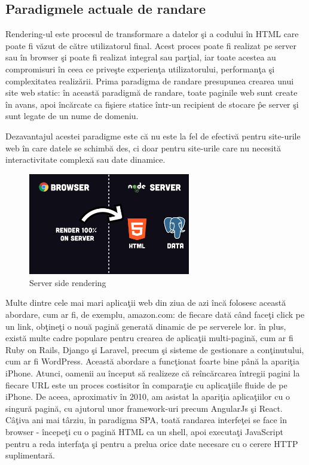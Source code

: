 \documentclass[12pt, a4paper]{report}
\begin{document}
\subsection{Paradigmele actuale de randare}

Rendering-ul este procesul de transformare a datelor \c si a codului \^ in HTML care poate fi v\u azut de c\u atre utilizatorul final. Acest proces poate fi realizat pe server sau \^ in browser \c si poate fi realizat integral sau par\c tial, iar toate acestea au compromisuri \^ in ceea ce prive\c ste experien\c ta utilizatorului, performan\c ta \c si complexitatea realizării. Prima paradigma de randare presupunea crearea unui site web static: \^ in aceast\u a paradigm\u a de randare, toate paginile web sunt create \^ in avans, apoi \^ inc\u arcate ca fi\c siere statice \^ intr-un recipient de stocare \^ pe server \c si sunt legate de un nume de domeniu.

Dezavantajul acestei paradigme este c\u a nu este la fel de efectivă pentru site-urile web \^ in care datele se schimb\u a des, ci doar pentru site-urile care nu necesit\u a interactivitate complexă sau date dinamice. \cite{benefitsserverrendering}

\begin{figure}[htbp]
	\centering
	\includegraphics[width=0.63\textwidth]{37.png}
	\caption{Server side rendering}
	\label{fig:server rendering}
\end{figure}

Multe dintre cele mai mari aplica\c tii web din ziua de azi \^ inc\u a folosesc aceast\u a abordare, cum ar fi, de exemplu, amazon.com: de fiecare dat\u a c\^ and face\c ti click pe un link, ob\c tine\c ti o nou\u a pagin\u a generat\u a dinamic de pe serverele lor. \^ in plus, exist\u a multe cadre populare pentru crearea de aplica\c tii multi-pagin\u a, cum ar fi Ruby on Rails, Django \c si Laravel, precum \c si sisteme de gestionare a con\c tinutului, cum ar fi WordPress. Aceast\u a abordare a func\c tionat foarte bine p\^ an\u a la apari\c tia iPhone. Atunci, oamenii au \^ inceput s\u a realizeze c\u a re\^ inc\u arcarea \^ intregii pagini la fiecare URL este un proces costisitor \^ in compara\c tie cu aplica\c tiile fluide de pe iPhone. De aceea, aproximativ \^ in 2010, am asistat la apari\c tia aplica\c tiilor cu o singur\u a pagin\u a, cu ajutorul unor framework-uri precum AngularJs \c si React. C\^ a\c tiva ani mai t\^ arziu, \^ in paradigma SPA, toat\u a randarea interfe\c tei se face \^ in browser - \^ incepe\c ti cu o pagin\u a HTML ca un shell, apoi executa\c ti JavaScript pentru a reda interfa\c ta \c si pentru a prelua orice date necesare cu o cerere HTTP suplimentar\u a.
\end{document}

